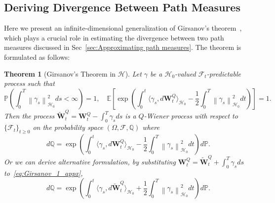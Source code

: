 \documentclass[nohyperref]{article}
\theoremstyle{plain}
\newtheorem{theorem}{Theorem}[section]
\theoremstyle{remark}
\newcommand{\la}{\langle}
\newcommand{\ra}{\rangle}
\newcommand{\mc}{\mathcal}
\newcommand{\mb}{\mathbf}
\newcommand{\norm}[1]{\left\lVert#1\right\rVert}
\begin{document}
\subsection{Deriving Divergence Between Path Measures}\label{sec:Deriving Divergence between Path Measures_appx}
Here we present an infinite-dimensional generalization of Girsanov's theorem~\citep[Theorem~10.14]{da2014stochastic}, which plays a crucial role in estimating the divergence between two path measures discussed in Sec~\ref{sec:Approximating path measures}. The theorem is formulated as follows:
\begin{theorem}[Girsanov's Theorem in $\mc{H}$] Let $\gamma$ be a $\mc{H}_0$-valued $\mc{F}_t$-predictable process such that
\begin{equation}
    \mathbb{P}\left(\int_0^T \norm{\gamma_s}_{\mc{H}_0}^2 ds < \infty \right) = 1, \quad \mathbb{E}\left[\exp\left( \int_0^t \la \gamma_s, d\mb{W}^Q_t\ra_{\mc{H}_0} - \frac{1}{2} \int_0^T  \norm{\gamma_s}_{\mc{H}_0}^2 dt\right)\right]=  1.
\end{equation}
Then the process $\mb{\tilde{W}}^Q_t = \mb{W}^Q_t - \int_0^T \gamma_s ds$ is a $Q$-Wiener process with respect to $\{\mc{F}_t\}_{t \geq 0}$ on the probability space $(\Omega, \mc{F}, \mathbb{Q})$ where
\begin{equation}\label{eq:Girsanov_1_appx}
    d\mathbb{Q} = \exp\left( \int_0^t \la \gamma_s, d\mb{W}^Q_t\ra_{\mc{H}_0} - \frac{1}{2} \int_0^T  \norm{\gamma_s}_{\mc{H}_0}^2 dt\right) d\mathbb{P}.
\end{equation}
Or we can derive alternative formulation, by substituting $\mb{W}^Q_t = \mb{\tilde{W}}^Q_t +  \int_0^T \gamma_s ds$ to~\eqref{eq:Girsanov_1_appx},
\begin{equation}\label{eq:Girsanov_2_appx}
    d\mathbb{Q} = \exp\left( \int_0^t \la \gamma_s, d\mb{\tilde{W}}^Q_t\ra_{\mc{H}_0} + \frac{1}{2} \int_0^T  \norm{\gamma_s}_{\mc{H}_0}^2 dt\right) d\mathbb{P}.
\end{equation}
\end{theorem}
\end{document}
